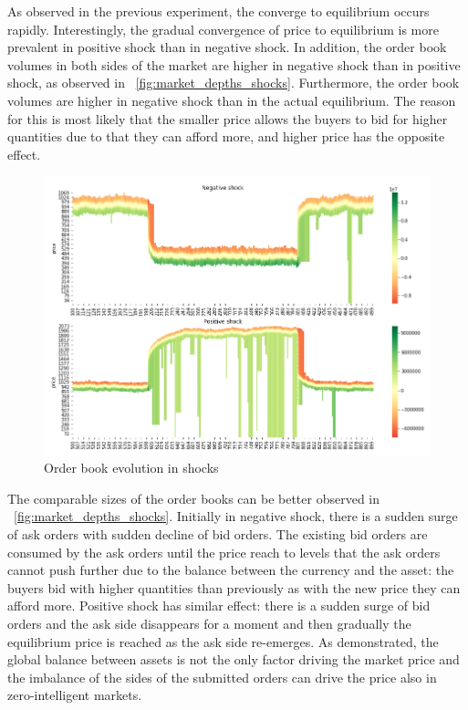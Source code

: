 As observed in the previous experiment, the converge to equilibrium occurs rapidly. Interestingly, the gradual convergence of price
to equilibrium is more prevalent in positive shock than in negative shock. In addition, the order book volumes in both sides of the
market are higher in negative shock than in positive shock, as observed in ~\ref{fig:market_depths_shocks}. Furthermore, the order 
book volumes are higher in negative shock than in the actual equilibrium. The reason for this is most likely that the smaller price 
allows the buyers to bid for higher quantities due to that they can afford more, and higher price has the opposite effect. 

\begin{figure}
    \includegraphics[width=\linewidth]{plots/shocks_order_book_evo.png}
    \caption{Order book evolution in shocks}
    \label{fig:shocks_orderbook}
\end{figure}

The comparable sizes of the order books can be better observed in ~\ref{fig:market_depths_shocks}. Initially in negative shock,
there is a sudden surge of ask orders with sudden decline of bid orders. The existing bid orders are consumed by the ask orders 
until the price reach to levels that the ask orders cannot push further due to the balance between the currency and the asset:
the buyers bid with higher quantities than previously as with the new price they can afford more. Positive shock has similar 
effect: there is a sudden surge of bid orders and the ask side disappears for a moment and then gradually the equilibrium
price is reached as the ask side re-emerges. As demonstrated, the global balance between assets is not the only factor driving the 
market price and the imbalance of the sides of the submitted orders can drive the price also in zero-intelligent markets.

